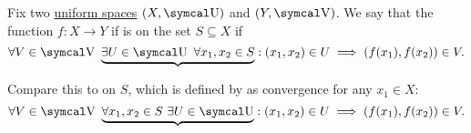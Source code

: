 \begin{Definition}\label{def:uniform_continuity}\cite[435]{Engelking1989}
  Fix two \hyperref[def:uniform_space]{uniform spaces} \( (X, \CU) \) and \( (Y, \CV) \). We say that the function \( f: X \to Y \) if is  on the set \( S \subseteq X \) if
  \begin{equation}\label{def:uniform_continuity/uniform}
    \forall V \in \CV \ \underbrace{\exists U \in \CU \ \forall x_1, x_2 \in S} : (x_1, x_2) \in U \implies (f(x_1), f(x_2)) \in V.
  \end{equation}

  Compare this to  on \( S \), which is defined by  as convergence for any \( x_1 \in X \):
  \begin{equation}\label{def:uniform_continuity/pointwise}
    \forall V \in \CV \ \underbrace{\forall x_1, x_2 \in S \ \exists U \in \CU} : (x_1, x_2) \in U \implies (f(x_1), f(x_2)) \in V.
  \end{equation}
\end{Definition}

